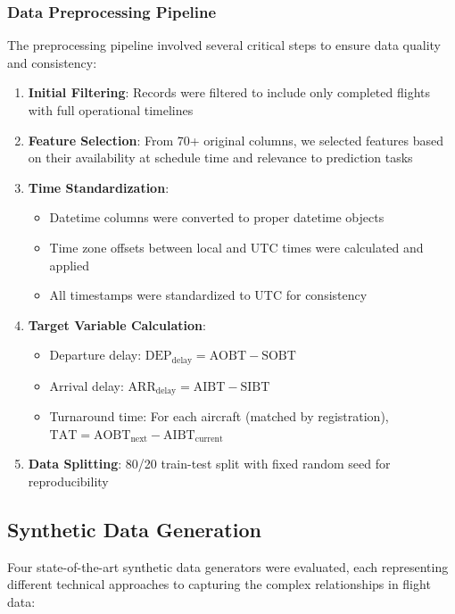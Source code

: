 \documentclass[conference]{IEEEtran}
\begin{document}
\subsubsection{Data Preprocessing Pipeline}
The preprocessing pipeline involved several critical steps to ensure data quality and consistency:

\begin{enumerate}
    \item \textbf{Initial Filtering}: Records were filtered to include only completed flights with full operational timelines
    \item \textbf{Feature Selection}: From 70+ original columns, we selected features based on their availability at schedule time and relevance to prediction tasks
    \item \textbf{Time Standardization}: 
    \begin{itemize}
        \item Datetime columns were converted to proper datetime objects
        \item Time zone offsets between local and UTC times were calculated and applied
        \item All timestamps were standardized to UTC for consistency
    \end{itemize}
    \item \textbf{Target Variable Calculation}:
    \begin{itemize}
        \item Departure delay: $\text{DEP}_{\text{delay}} = \text{AOBT} - \text{SOBT}$
        \item Arrival delay: $\text{ARR}_{\text{delay}} = \text{AIBT} - \text{SIBT}$
        \item Turnaround time: For each aircraft (matched by registration), $\text{TAT} = \text{AOBT}_{\text{next}} - \text{AIBT}_{\text{current}}$
    \end{itemize}
    \item \textbf{Data Splitting}: 80/20 train-test split with fixed random seed for reproducibility
\end{enumerate}

\subsection{Synthetic Data Generation}
Four state-of-the-art synthetic data generators were evaluated, each representing different technical approaches to capturing the complex relationships in flight data:
\end{document}
